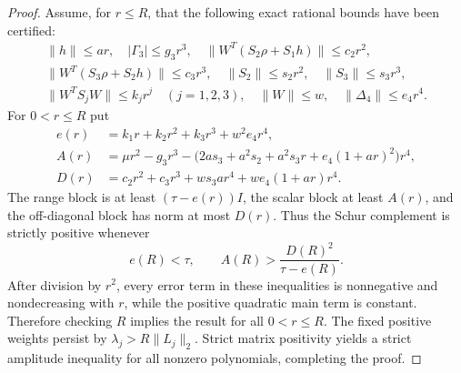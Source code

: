 \documentclass[11pt]{article}
\begin{document}
\begin{proof}
Assume, for $r\le R$, that the following exact rational bounds have been certified:
\begin{equation}\label{eq:atom-bounds}
\begin{gathered}
 \|h\|\le ar,\quad |\Gamma_3|\le g_3r^3,\quad
 \|W^T(S_2\rho+S_1h)\|\le c_2r^2,\\
 \|W^T(S_3\rho+S_2h)\|\le c_3r^3,\quad
 \|S_2\|\le s_2r^2,\quad\|S_3\|\le s_3r^3,\\
 \|W^TS_jW\|\le k_jr^j\quad(j=1,2,3),\quad
 \|W\|\le w,\quad \|\Delta_4\|\le e_4r^4.
\end{gathered}
\end{equation}
For $0<r\le R$ put
\begin{equation}\label{eq:atom-sc-functions}
\begin{aligned}
 e(r)&=k_1r+k_2r^2+k_3r^3+w^2e_4r^4,\\
 A(r)&=\mu r^2-g_3r^3-
 \bigl(2as_3+a^2s_2+a^2s_3r+e_4(1+ar)^2\bigr)r^4,\\
 D(r)&=c_2r^2+c_3r^3+ws_3ar^4+we_4(1+ar)r^4.
\end{aligned}
\end{equation}
The range block is at least $(\tau-e(r))I$, the scalar block at least $A(r)$, and the off-diagonal block has norm at most $D(r)$.  Thus the Schur complement is strictly positive whenever
\begin{equation}\label{eq:atom-radius}
 e(R)<\tau,\qquad A(R)>\frac{D(R)^2}{\tau-e(R)}.
\end{equation}
After division by $r^2$, every error term in these inequalities is nonnegative and nondecreasing with $r$, while the positive quadratic main term is constant.  Therefore checking $R$ implies the result for all $0<r\le R$.  The fixed positive weights persist by $\lambda_j>R\|L_j\|_2$.  Strict matrix positivity yields a strict amplitude inequality for all nonzero polynomials, completing the proof.
\end{proof}
\end{document}
